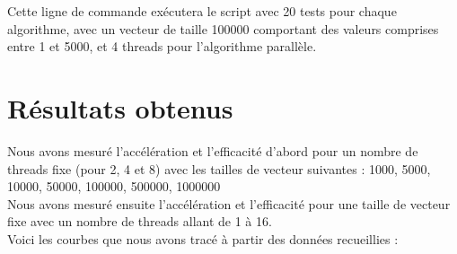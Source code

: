 \documentclass{article}
\begin{document}
Cette ligne de commande exécutera le script avec 20 tests pour chaque algorithme, avec un vecteur de taille 100000 comportant des valeurs comprises entre 1 et 5000, et 4 threads pour l'algorithme parallèle.

\section{Résultats obtenus}

Nous avons mesuré l'accélération et l'efficacité d'abord pour un nombre de threads fixe (pour 2, 4 et 8) avec les tailles de vecteur suivantes :
	 1000,
	 5000,
	10000,
	 50000,
	 100000,
	 500000,
	 1000000\\

Nous avons mesuré ensuite l'accélération et l'efficacité pour une taille de vecteur fixe avec un nombre de threads allant de 1 à 16.\\

Voici les courbes que nous avons tracé à partir des données recueillies :\\
\end{document}
